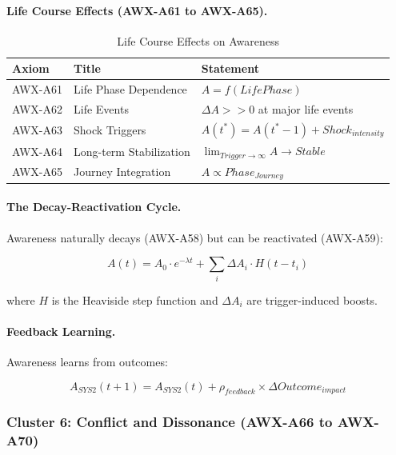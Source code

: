 \paragraph{Life Course Effects (AWX-A61 to AWX-A65).}

\begin{table}[htbp]
\centering
\caption{Life Course Effects on Awareness}
\label{tab:life-course-effects}
\renewcommand{\arraystretch}{1.3}
\begin{tabular}{@{}llp{5.5cm}@{}}
\toprule
\textbf{Axiom} & \textbf{Title} & \textbf{Statement} \\
\midrule
AWX-A61 & Life Phase Dependence & $A = f(LifePhase)$ \\
AWX-A62 & Life Events & $\Delta A >> 0$ at major life events \\
AWX-A63 & Shock Triggers & $A(t^*) = A(t^*-1) + Shock_{intensity}$ \\
AWX-A64 & Long-term Stabilization & $\lim_{Trigger \to \infty} A \to Stable$ \\
AWX-A65 & Journey Integration & $A \propto Phase_{Journey}$ \\
\bottomrule
\end{tabular}
\end{table}

\paragraph{The Decay-Reactivation Cycle.}
Awareness naturally decays (AWX-A58) but can be reactivated (AWX-A59):

\begin{equation}
A(t) = A_0 \cdot e^{-\lambda t} + \sum_i \Delta A_i \cdot H(t - t_i)
\end{equation}

where $H$ is the Heaviside step function and $\Delta A_i$ are trigger-induced boosts.

\paragraph{Feedback Learning.}
Awareness learns from outcomes:

\begin{equation}
A_{SYS2}(t+1) = A_{SYS2}(t) + \rho_{feedback} \times \Delta Outcome_{impact}
\end{equation}

\subsubsection{Cluster 6: Conflict and Dissonance (AWX-A66 to AWX-A70)}

